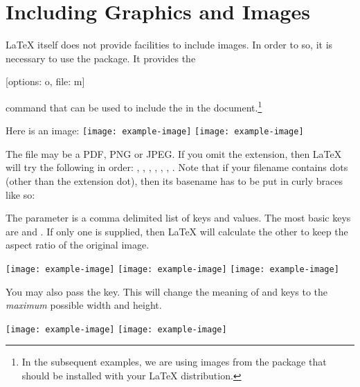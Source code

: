 \section{Including Graphics and Images}\label{sec:images}

\LaTeX{} itself does not provide facilities to include images. In order to so,
it is necessary to use the  package. It provides the
\begin{lscommand}
  [options: o, file: m]
\end{lscommand}
command that can be used to include the  in the
document.\footnote{In the subsequent examples, we are using images from the
   package that should be installed with your \LaTeX{} distribution.} %
\begin{example}
Here is an image:
\texttt{[image: example-image]}
\texttt{[image: example-image]}%
\end{example}
The file may be a PDF, PNG or JPEG\@. If you omit the extension, then
\LaTeX{} will try the following in order: , , ,
, , , . Note that if your filename
contains dots (other than the extension dot), then its basename has to be put in
curly braces like so:
\begin{code}
  \texttt|\texttt{[image: \{image.with.dots]}.jpg}|
\end{code}

The  parameter is a comma delimited list of keys and values. The
most basic keys are  and . If only one is supplied,
then \LaTeX{} will calculate the other to keep the aspect ratio of the
original image.
\begin{example}[examplewidth=0.85\linewidth, vertical_mode]
\texttt{[image: example-image]}
\texttt{[image: example-image]}
\texttt{[image: example-image]}
\end{example}

You may also pass the  key. This will change the meaning
of  and  keys to the \emph{maximum} possible width
and height.
\begin{example}[examplewidth=0.6\linewidth]
\texttt{[image: example-image]}
\texttt{[image: example-image]}
\end{example}


